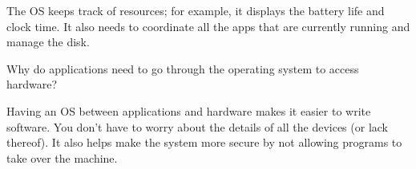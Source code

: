 \begin{answer}[5em]
The OS keeps track of resources; for example, it displays the battery life and clock time.
It also needs to coordinate all the apps that are currently running and manage the disk.
\end{answer}


\Q Why do applications need to go through the operating system to access hardware?

\begin{answer}[5em]
Having an OS between applications and hardware makes it easier to write software.
You don't have to worry about the details of all the devices (or lack thereof).
It also helps make the system more secure by not allowing programs to take over the machine.
\end{answer}

